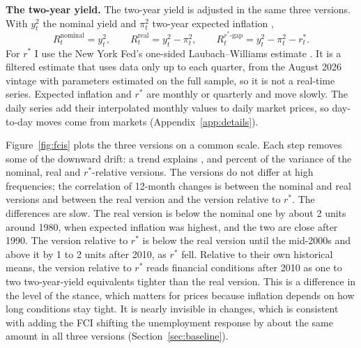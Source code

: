 \documentclass[11pt]{article}
\newcommand{\rs}{r^{*}}
\begin{document}
\textbf{The two-year yield.} The two-year yield is adjusted in the same three versions. With $y^{2}_t$ the nominal yield and $\pi^{2}_t$ two-year expected inflation \citep[from the Cleveland Fed;][]{haubrich2012},
\begin{equation}
R_t^{\text{nominal}} = y^{2}_t, \qquad R_t^{\text{real}} = y^{2}_t - \pi^{2}_t, \qquad R_t^{\rs\text{-gap}} = y^{2}_t - \pi^{2}_t - \rs_t. \label{eq:twoyear}
\end{equation}
For $\rs$ I use the New York Fed's one-sided Laubach--Williams estimate \citep{holston2023}. It is a filtered estimate that uses data only up to each quarter, from the August 2026 vintage with parameters estimated on the full sample, so it is not a real-time series. Expected inflation and $\rs$ are monthly or quarterly and move slowly. The daily series add their interpolated monthly values to daily market prices, so day-to-day moves come from markets (Appendix~\ref{app:details}).

Figure~\ref{fig:fcis} plots the three versions on a common scale. Each step removes some of the downward drift: a trend explains ,  and  percent of the variance of the nominal, real and $\rs$-relative versions. The versions do not differ at high frequencies; the correlation of 12-month changes is  between the nominal and real versions and  between the real version and the version relative to $\rs$. The differences are slow. The real version is below the nominal one by about 2 units around 1980, when expected inflation was highest, and the two are close after 1990. The version relative to $\rs$ is below the real version until the mid-2000s and above it by 1 to 2 units after 2010, as $\rs$ fell. Relative to their own historical means, the version relative to $\rs$ reads financial conditions after 2010 as one to two two-year-yield equivalents tighter than the real version. This is a difference in the level of the stance, which matters for prices because inflation depends on how long conditions stay tight. It is nearly invisible in changes, which is consistent with adding the FCI shifting the unemployment response by about the same amount in all three versions (Section~\ref{sec:baseline}).
\end{document}
